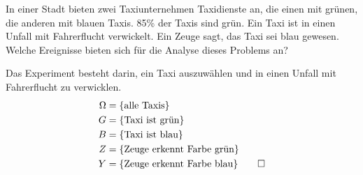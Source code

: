 In einer Stadt bieten zwei Taxiunternehmen Taxidienste an, die einen mit
grünen, die anderen mit blauen Taxis. 85\% der Taxis sind grün.
Ein Taxi ist in einen Unfall mit Fahrerflucht verwickelt.
Ein Zeuge sagt, das Taxi sei blau gewesen.
Welche Ereignisse bieten sich für die Analyse dieses Problems an?


\begin{loesung}
Das Experiment besteht darin, ein Taxi auszuwählen und in einen Unfall
mit Fahrerflucht zu verwicklen.
\begin{align*}
\Omega&=\{\text{alle Taxis}\}\\
G&=\{\text{Taxi ist grün}\}\\
B&=\{\text{Taxi ist blau}\}\\
Z&=\{\text{Zeuge erkennt Farbe grün}\}\\
Y&=\{\text{Zeuge erkennt Farbe blau}\}
\qedhere
\end{align*}
\end{loesung}
